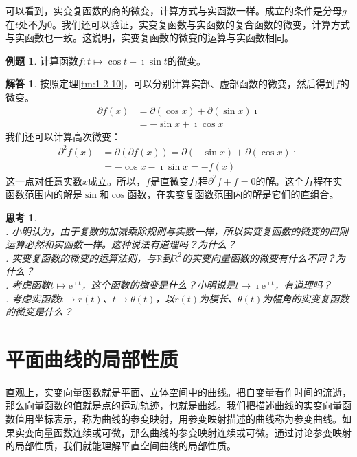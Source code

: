 \documentclass[12pt,UTF8]{ctexbook}
\newcommand{\e}{\mathrm{e}}
\theoremstyle{definition}
\newtheorem{et}{例题}[section]
\newtheorem*{so}{解答}
\theoremstyle{plain}
\newtheorem{sk}{思考}[section]
\begin{document}
可以看到，实变复函数的商的微变，计算方式与实函数一样。成立的条件是分母$g$在$t$处不为$0$。我们还可以验证，实变复函数与实函数的复合函数的微变，计算方式与实函数也一致。这说明，实变复函数的微变的运算与实函数相同。

\begin{et}
    计算函数$f: t\mapsto \cos{t} + \imath \sin{t}$的微变。
\end{et}

\begin{so}
    按照定理\ref{tm:1-2-10}，可以分别计算实部、虚部函数的微变，然后得到$f$的微变。
    \begin{align*}
        \partial f(x) &= \partial (\cos{x}) + \partial (\sin{x}) \imath \\
        &= -\sin{x} + \imath \cos{x}
    \end{align*}
    我们还可以计算高次微变：
    \begin{align*}
        \partial^2 f(x) &= \partial (\partial f(x)) = \partial (-\sin{x}) + \partial (\cos{x}) \imath \\
        &= -\cos{x} - \imath \sin{x} = -f(x)
    \end{align*}
    这一点对任意实数$x$成立。所以，$f$是直微变方程$\partial^2 f + f = 0$的解。这个方程在实函数范围内的解是$\sin$和$\cos$函数，在实变复函数范围内的解是它们的直组合。
\end{so}

\begin{sk}
    \mbox{}\\
    . 小明认为，由于复数的加减乘除规则与实数一样，所以实变复函数的微变的四则运算必然和实函数一样。这种说法有道理吗？为什么？\\
    . 实变复函数的微变的运算法则，与$\mathbb{R}$到$\mathbb{R}^2$的实变向量函数的微变有什么不同？为什么？\\
    . 考虑函数$t \mapsto \e^{\imath t}$，这个函数的微变是什么？小明说是$t \mapsto \imath \e^{\imath t}$，有道理吗？\\
    . 考虑实函数$t \mapsto r(t)$、$t \mapsto \theta(t)$，以$r(t)$为模长、$\theta(t)$为幅角的实变复函数的微变是什么？
\end{sk}

\section{平面曲线的局部性质}

直观上，实变向量函数就是平面、立体空间中的曲线。把自变量看作时间的流逝，那么向量函数的值就是点的运动轨迹，也就是曲线。我们把描述曲线的实变向量函数值用坐标表示，称为曲线的参变映射，用参变映射描述的曲线称为参变曲线。如果实变向量函数连续或可微，那么曲线的参变映射连续或可微。通过讨论参变映射的局部性质，我们就能理解平直空间曲线的局部性质。
\end{document}
